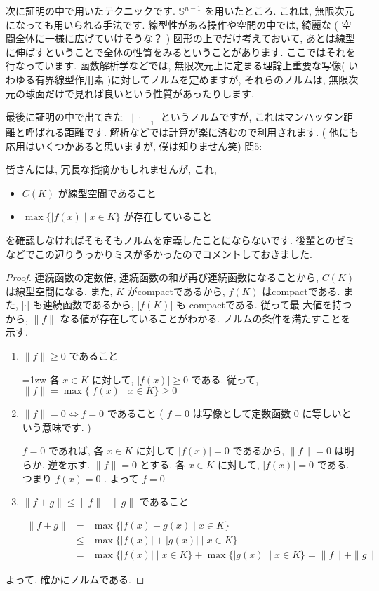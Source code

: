 \documentclass[dvipdfmx,uplatex,11pt]{jsarticle}
\theoremstyle{definition}
\begin{document}
次に証明の中で用いたテクニックです.  $\mathbb S^{n-1}$ を用いたところ. これは, 無限次元になっても用いられる手法です. 線型性がある操作や空間の中では, 綺麗な ( 空間全体に一様に広げていけそうな？ ) 図形の上でだけ考えておいて, あとは線型に伸ばすということで全体の性質をみるということがあります. ここではそれを行なっています. 函数解析学などでは, 無限次元上に定まる理論上重要な写像( いわゆる有界線型作用素 )に対してノルムを定めますが, それらのノルムは, 無限次元の球面だけで見れば良いという性質があったりします. \par
最後に証明の中で出てきた $\| \cdot \| _ 1$ というノルムですが, これはマンハッタン距離と呼ばれる距離です. 解析などでは計算が楽に済むので利用されます. ( 他にも応用はいくつかあると思いますが, 僕は知りません笑)
\newpage
問5:\par 
皆さんには, 冗長な指摘かもしれませんが, これ, 
	\begin{itemize}
		\item $C ( K )$ が線型空間であること
		\item $\max \{ | f ( x ) \mid x \in K \}$ が存在していること
\end{itemize}
を確認しなければそもそもノルムを定義したことにならないです. 後輩とのゼミなどでこの辺りうっかりミスが多かったのでコメントしておきました. \\
\dotfill
\begin{leftbar}
	\begin{proof}
	連続函数の定数倍, 連続函数の和が再び連続函数になることから, $C ( K )$ は線型空間になる. また, $K$ がcompactであるから, $f ( K )$ はcompactである. また, $| \cdot |$ も連続函数であるから, $| f ( K ) |$ も compactである. 従って最
	大値を持つから, $\| f \|$ なる値が存在していることがわかる. ノルムの条件を満たすことを示す. 
		\begin{enumerate}
			\item $\| f \| \geq 0$ であること
				
				\parindent=1zw 各 $x \in K$ に対して, $| f ( x ) | \geq 0$ である. 従って, $\| f \| = \max \{ | f ( x ) \mid x \in K \} \geq 0$
				
			\item $\| f \| = 0 \Leftrightarrow f = 0$ であること ( $f = 0$ は写像として定数函数 $0$ に等しいという意味です. )	
				
				$f = 0$ であれば, 各 $x \in K$ に対して $| f ( x ) | = 0$ であるから, $\| f \| = 0$ は明らか. 逆を示す. $\| f \| = 0$ とする. 各 $x \in K$ に対して, $| f ( x ) | = 0$ である. つまり $f ( x ) = 0$ . よって $f = 0$
				
			\item $\| f + g \| \leq \| f \| + \| g \|$ であること
			
				\begin{eqnarray*}
					\| f + g \| & = & \max \{ | f ( x ) + g ( x ) \mid x \in K \} \\
					& \leq & \max \{ | f ( x ) | + | g ( x ) | \mid x \in K \} \\
					& = & \max \{ | f ( x ) |  \mid x \in K \} + \max \{ | g ( x ) |  \mid x \in K \} = \| f \| + \| g \|
				\end{eqnarray*}
		\end{enumerate}
	よって, 確かにノルムである. 
\end{proof}
\end{leftbar}
\end{document}
